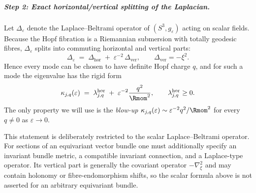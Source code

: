 \documentclass[11pt,a4paper]{article}
\begin{document}
\subparagraph{Step 2: Exact horizontal/vertical splitting of the Laplacian.}
Let $\Delta_\varepsilon$ denote the Laplace--Beltrami operator of $(S^3,g_\varepsilon)$
acting on scalar fields.
Because the Hopf fibration is a Riemannian submersion with totally geodesic fibres,
$\Delta_\varepsilon$ splits into commuting horizontal and vertical parts:
\begin{equation}
\label{p3:eq:berger-splitting}
\Delta_\varepsilon \;=\; \Delta_{\mathrm{hor}} \;+\; \varepsilon^{-2}\,\Delta_{\mathrm{ver}},
\qquad
\Delta_{\mathrm{ver}} = -\xi^2.
\end{equation}
Hence every mode can be chosen to have definite Hopf charge $q$, and for such a mode
the eigenvalue has the rigid form
\begin{equation}
\label{p3:eq:berger-eigs}
\kappa_{j,q}(\varepsilon) \;=\; \lambda^{\mathrm{hor}}_{j,q} \;+\; \varepsilon^{-2}\frac{q^2}{\Rmom^2},
\qquad \lambda^{\mathrm{hor}}_{j,q}\ge 0.
\end{equation}
The only property we will use is the \emph{blow-up} $\kappa_{j,q}(\varepsilon)\sim
\varepsilon^{-2}q^2/\Rmom^2$ for every $q\neq 0$ as $\varepsilon\to 0$.

This statement is deliberately restricted to the scalar Laplace--Beltrami
operator.  For sections of an equivariant vector bundle one must additionally
specify an invariant bundle metric, a compatible invariant connection, and a
Laplace-type operator.  Its vertical part is generally the covariant operator
$-\nabla_\xi^2$ and may contain holonomy or fibre-endomorphism shifts, so the
scalar formula above is not asserted for an arbitrary equivariant bundle.
\end{document}
